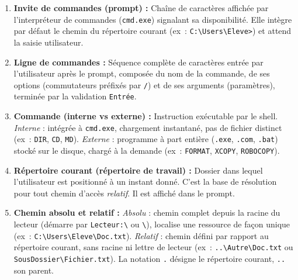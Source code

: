 \documentclass[11pt]{article}
\begin{document}
\begin{corrige}
\begin{enumerate}
    \item \textbf{Invite de commandes (prompt) :} Chaîne de caractères affichée par l'interpréteur de commandes (\texttt{cmd.exe}) signalant sa disponibilité. Elle intègre par défaut le chemin du répertoire courant (ex~: \texttt{C:\textbackslash Users\textbackslash Eleve>}) et attend la saisie utilisateur.
    \item \textbf{Ligne de commandes :} Séquence complète de caractères entrée par l'utilisateur après le prompt, composée du nom de la commande, de ses options (commutateurs préfixés par \texttt{/}) et de ses arguments (paramètres), terminée par la validation \texttt{Entrée}.
    \item \textbf{Commande (interne vs externe) :} Instruction exécutable par le shell. \emph{Interne} : intégrée à \texttt{cmd.exe}, chargement instantané, pas de fichier distinct (ex~: \texttt{DIR}, \texttt{CD}, \texttt{MD}). \emph{Externe} : programme à part entière (\texttt{.exe}, \texttt{.com}, \texttt{.bat}) stocké sur le disque, chargé à la demande (ex~: \texttt{FORMAT}, \texttt{XCOPY}, \texttt{ROBOCOPY}).
    \item \textbf{Répertoire courant (répertoire de travail) :} Dossier dans lequel l'utilisateur est positionné à un instant donné. C'est la base de résolution pour tout chemin d'accès \emph{relatif}. Il est affiché dans le prompt.
    \item \textbf{Chemin absolu et relatif :} \emph{Absolu} : chemin complet depuis la racine du lecteur (démarre par \texttt{Lecteur:\textbackslash} ou \texttt{\textbackslash}), localise une ressource de façon unique (ex~: \texttt{C:\textbackslash Users\textbackslash Eleve\textbackslash Doc.txt}). \emph{Relatif} : chemin défini par rapport au répertoire courant, sans racine ni lettre de lecteur (ex~: \texttt{..\textbackslash Autre\textbackslash Doc.txt} ou \texttt{SousDossier\textbackslash Fichier.txt}). La notation \texttt{.} désigne le répertoire courant, \texttt{..} son parent.
\end{enumerate}
\end{corrige}
\end{document}
